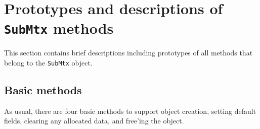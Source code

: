 \par
\section{Prototypes and descriptions of {\tt SubMtx} methods}
\label{section:SubMtx:proto}
\par
This section contains brief descriptions including prototypes
of all methods that belong to the {\tt SubMtx} object.
\par
\subsection{Basic methods}
\label{subsection:SubMtx:proto:basics}
\par
As usual, there are four basic methods to support object creation,
setting default fields, clearing any allocated data, and free'ing
the object.
\par
